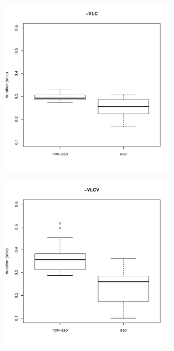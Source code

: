 \documentclass[11pt,a4paper,oneside,openany]{memoir}\usepackage[]{graphicx}\usepackage[]{color}
\newenvironment{knitrout}{}{} %
\begin{document}
\begin{figure}
\begin{subfigure}{.5\textwidth}
\centering
\begin{knitrout}
\color{fgcolor}
\includegraphics[width=\textwidth]{img/mono-lat-box-1} 

\end{knitrout}
\end{subfigure}
\begin{subfigure}{.5\textwidth}
\centering
\begin{knitrout}
\color{fgcolor}
\includegraphics[width=\textwidth]{img/di-lat-box-1} 


\end{knitrout}
\end{subfigure}
\end{figure}
\end{document}
